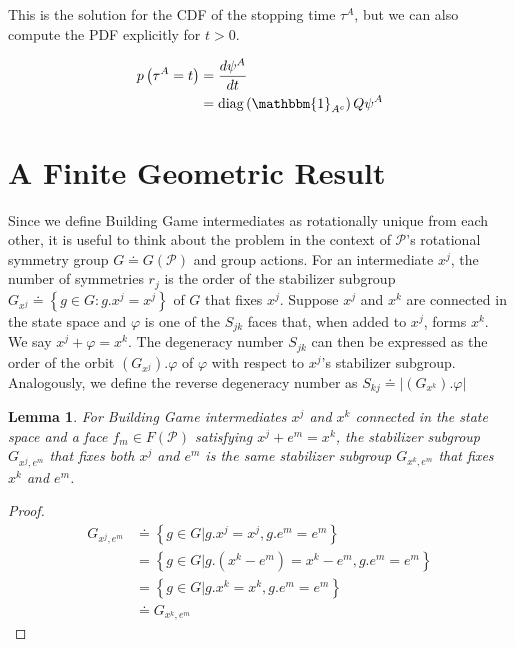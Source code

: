 \documentclass[12pt]{article}
\newtheorem{mylem}{Lemma}
\newcommand{\faceset}{F\left(\mathscr{P}\right)}
\DeclareMathOperator{\diag}{diag}
\begin{document}
This is the solution for the CDF of the stopping time $\tau^A$, but we can also compute the PDF explicitly for $t > 0$.

\begin{align}
        p\left(\tau^A = t\right) &= \frac{d\psi^A}{dt} \\
        &= \diag\left(\mathbbm{1}_{A^c}\right)Q\psi^A
\end{align} 


\section{A Finite Geometric Result}

Since we define Building Game intermediates as rotationally unique from each other, it is useful to think about the problem in the context of $\mathscr{P}$'s rotational symmetry group $G \doteq G\left(\mathscr{P}\right)$ and group actions. For an intermediate $x^j$, the number of symmetries $r_j$ is the order of the stabilizer subgroup $G_{x^j} \doteq \left\{g \in G : g.x^j = x^j\right\}$ of $G$ that fixes $x^j$. Suppose $x^j$ and $x^k$ are connected in the state space and $\varphi$ is one of the $S_{jk}$ faces that, when added to $x^j$, forms $x^k$. We say $x^j + \varphi = x^k$. The degeneracy number $S_{jk}$ can then be expressed as the order of the orbit $\left(G_{x^j}\right).\varphi$ of $\varphi$ with respect to $x^j$'s stabilizer subgroup. Analogously, we define the reverse degeneracy number as $S_{kj} \doteq \left|\left(G_{x^k}\right).\varphi\right|$

\begin{mylem}
\label{lem:I}
For Building Game intermediates $x^j$ and $x^k$ connected in the state space and a face $f_m \in \faceset$ satisfying $x^j + e^m = x^k$, the stabilizer subgroup $G_{x^j,e^m}$ that fixes both $x^j$ and $e^m$ is the same stabilizer subgroup $G_{x^k,e^m}$ that fixes $x^k$ and $e^m$.
\end{mylem}
\begin{proof}
\begin{align}
G_{x^j,e^m} &\doteq \left\{g \in G | g.x^j = x^j, g.e^m = e^m \right\} \\
                &= \left\{g \in G | g.\left(x^k - e^m\right) = x^k - e^m, g.e^m = e^m \right\} \\
                &= \left\{g \in G | g.x^k = x^k, g.e^m = e^m \right\} \\
                &\doteq G_{x^k,e^m}
\end{align}
\end{proof}
\end{document}
